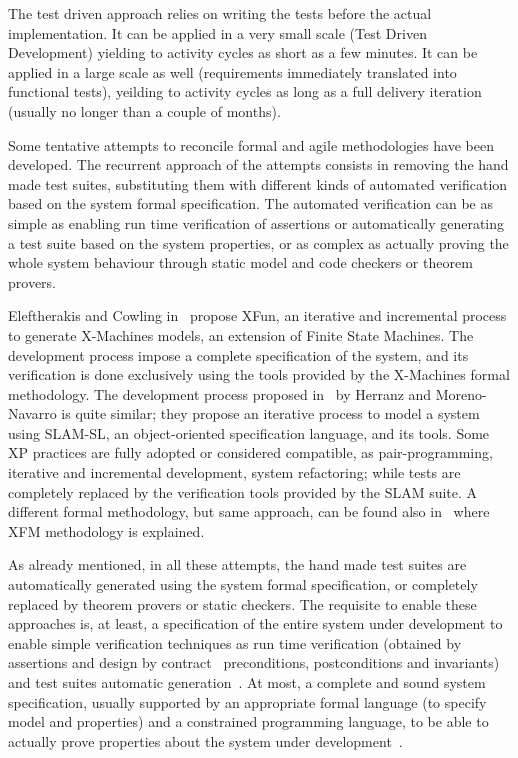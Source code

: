\documentclass[english]{lni}
\begin{document}
The test driven approach relies on writing the tests before the actual implementation. 
It can be applied in a very small scale (Test Driven Development) yielding to activity cycles as short as a few minutes.
It can be applied in a large scale as well (requirements immediately translated into functional tests), yeilding to activity cycles as long as a full delivery iteration (usually no longer than a couple of months).

Some tentative attempts to reconcile formal and agile methodologies have been developed.
The recurrent approach of the attempts consists in removing the hand made test suites, substituting them with different kinds of automated verification based on the system formal specification. 
The automated verification can be as simple as enabling run time verification of assertions or automatically generating a test suite based on the system properties, or as complex as actually proving the whole system behaviour through static model and code checkers or theorem provers.

Eleftherakis and Cowling in~\cite{Eleftherakis2003} propose XFun, an iterative and incremental process to generate X-Machines models, an extension of Finite State Machines. 
The development process impose a complete specification of the system, and its verification is done exclusively using the tools provided by the X-Machines formal methodology. 
The development process proposed in~\cite{Herranz2003b} by Herranz and Moreno-Navarro is quite similar; they propose an iterative process to model a system using SLAM-SL, an object-oriented specification language, and its tools. 
Some XP practices are fully adopted or considered compatible, as pair-programming, iterative and incremental development, system refactoring; while tests are completely replaced by the verification tools provided by the SLAM suite.
A different formal methodology, but same approach, can be found also in~\cite{Suhaib2005} where XFM methodology is explained.

As already mentioned, in all these attempts, the hand made test suites are automatically generated using the system formal specification, or completely replaced by theorem provers or static checkers. 
The requisite to enable these approaches is, at least, a specification of the entire system under development to enable simple verification techniques as run time verification (obtained by assertions and design by contract~\cite{Meyer1997} preconditions, postconditions and invariants) and test suites automatic generation~\cite{Cheon2002,Cheon2004,Cheon2005}.
At most, a complete and sound system specification, usually supported by an appropriate formal language (to specify model and properties) and a constrained programming language, to be able to actually prove properties about the system under development~\cite{CatanoHuisman02,DetlefsNelsonSaxe2005,KiniryCok04}.
\end{document}
